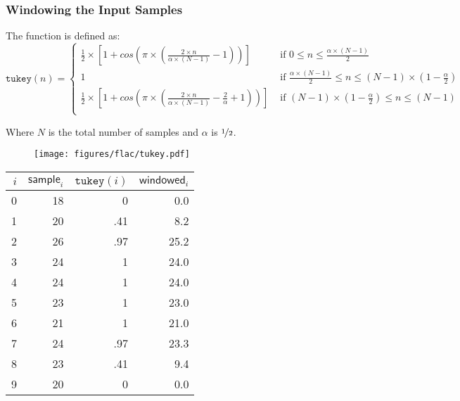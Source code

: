 \clearpage


\subsubsection{Windowing the Input Samples}
\label{flac:window}
\Return \WINDOWED\;
\EALGORITHM
\par
\noindent
The  function is defined as:
\begin{equation*}
\texttt{tukey}(n) =
\begin{cases}
\frac{1}{2} \times \left[1 + cos\left(\pi \times \left(\frac{2 \times n}{\alpha \times (N - 1)} - 1 \right)\right)\right] & \text{ if } 0 \leq n \leq \frac{\alpha \times (N - 1)}{2} \\
1 & \text{ if } \frac{\alpha \times (N - 1)}{2} \leq n \leq (N - 1) \times (1 - \frac{\alpha}{2}) \\
\frac{1}{2} \times \left[1 + cos\left(\pi \times \left(\frac{2 \times n}{\alpha \times (N - 1)} - \frac{2}{\alpha} + 1 \right)\right)\right] & \text{ if } (N - 1) \times (1 - \frac{\alpha}{2}) \leq n \leq (N - 1) \\
\end{cases}
\end{equation*}
\par
\noindent
Where $N$ is the total number of samples and $\alpha$ is $\nicefrac{1}{2}$.
\par
\noindent
\begin{wrapfigure}[5]{r}{3in}
\texttt{[image: figures/flac/tukey.pdf]}
\end{wrapfigure}
\begin{table}[h]
\begin{tabular}{r|r|r|r}
$i$ & $\textsf{sample}_i$ & $\texttt{tukey}(i)$ & $\textsf{windowed}_i$ \\
\hline
0 & 18 & 0 & 0.0 \\
1 & 20 & .41 & 8.2 \\
2 & 26 & .97 & 25.2 \\
3 & 24 & 1 & 24.0 \\
4 & 24 & 1 & 24.0 \\
5 & 23 & 1 & 23.0 \\
6 & 21 & 1 & 21.0 \\
7 & 24 & .97 & 23.3 \\
8 & 23 & .41 & 9.4 \\
9 & 20 & 0 & 0.0 \\
\end{tabular}
\end{table}

